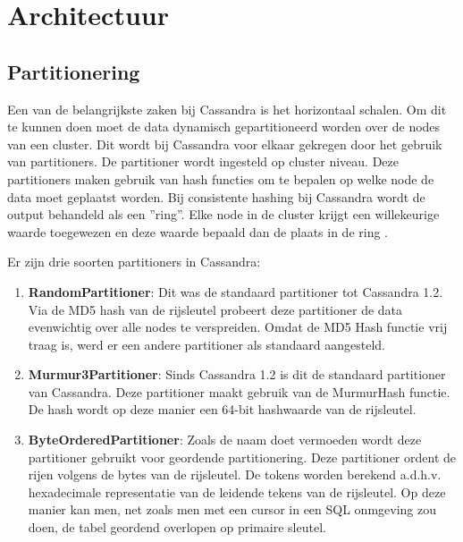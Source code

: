 \chapter{Architectuur}
\label{ch:cassandra_architectuur}

\section{Partitionering}
Een van de belangrijkste zaken bij Cassandra is het horizontaal schalen.
Om dit te kunnen doen moet de data dynamisch gepartitioneerd worden over de nodes van een cluster.
Dit wordt bij Cassandra voor elkaar gekregen door het gebruik van partitioners.
De partitioner wordt ingesteld op cluster niveau.
Deze partitioners maken gebruik van hash functies om te bepalen op welke node de data moet geplaatst worden.
Bij consistente hashing bij Cassandra wordt de output behandeld als een ''ring''.
Elke node in de cluster krijgt een willekeurige waarde toegewezen en deze waarde bepaald dan de plaats in de ring \citep{lakshman2010cassandra}.


Er zijn drie soorten partitioners in Cassandra:

\begin{enumerate}
	\item \textbf{RandomPartitioner}:
	Dit was de standaard partitioner tot Cassandra 1.2.
	Via de MD5 hash van de rijsleutel probeert deze partitioner de data evenwichtig over alle nodes te verspreiden.
	Omdat de MD5 Hash functie vrij traag is, werd er een andere partitioner als standaard aangesteld.
	
	\item \textbf{Murmur3Partitioner}:
	Sinds Cassandra 1.2 is dit de standaard partitioner van Cassandra.
	Deze partitioner maakt gebruik van de MurmurHash functie.
	De hash wordt op deze manier een 64-bit hashwaarde van de rijsleutel.
	
	\item \textbf{ByteOrderedPartitioner}:
	Zoals de naam doet vermoeden wordt deze partitioner gebruikt voor geordende partitionering.
	Deze partitioner ordent de rijen volgens de bytes van de rijsleutel.
	De tokens worden berekend a.d.h.v. hexadecimale representatie van de leidende tekens van de rijsleutel.
	Op deze manier kan men, net zoals men met een cursor in een SQL onmgeving zou doen, de tabel geordend overlopen op primaire sleutel.
	
\end{enumerate}

